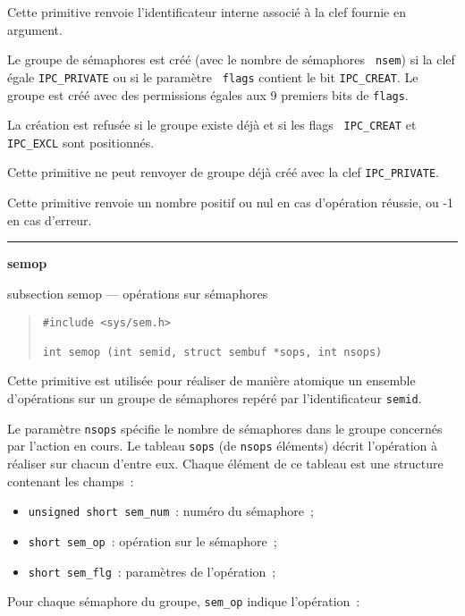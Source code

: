 \documentclass [twoside] {report}
\newcommand {\primitive} [1]
    {
	\phantomsection
	{\large \bf #1}
	\addcontentsline {toc} {subsection} {#1}
    }
\newcommand {\separation}
    {
	\vspace {5mm}
	\nopagebreak
	\hrule
    }
\begin{document}
Cette primitive renvoie l'identificateur interne associé à la clef
fournie en argument.

Le groupe de sémaphores est créé (avec le nombre de sémaphores {\tt
nsem}) si la clef égale {\tt IPC\_PRIVATE} ou si le paramètre {\tt
flags} contient le bit {\tt IPC\_CREAT}.  Le groupe est créé avec des
permissions égales aux 9 premiers bits de {\tt flags}.

La création est refusée si le groupe existe déjà et si les flags {\tt
IPC\_CREAT} et {\tt IPC\_EXCL} sont positionnés.

Cette primitive ne peut renvoyer de groupe déjà créé avec la clef
{\tt IPC\_PRIVATE}.

Cette primitive renvoie un nombre positif ou nul en cas d'opération
réussie, ou -1 en cas d'erreur.


\separation
\primitive {semop} --- opérations sur sémaphores

\begin {quote}
\begin {verbatim}
#include <sys/sem.h>

int semop (int semid, struct sembuf *sops, int nsops)
\end{verbatim}
\end {quote}

Cette primitive est utilisée pour réaliser de manière atomique un
ensemble d'opérations sur un groupe de sémaphores repéré par
l'identificateur {\tt semid}.

Le paramètre {\tt nsops} spécifie le nombre de sémaphores dans le groupe
concernés par l'action en cours.  Le tableau {\tt sops} (de {\tt nsops}
éléments) décrit l'opération à réaliser sur chacun d'entre eux.  Chaque
élément de ce tableau est une structure contenant les champs~:

\begin {itemize}
    \item {\tt unsigned short sem\_num}~: numéro du sémaphore~;
    \item {\tt short sem\_op}~: opération sur le sémaphore~;
    \item {\tt short sem\_flg}~: paramètres de l'opération~;
\end {itemize}

Pour chaque sémaphore du groupe, {\tt sem\_op} indique l'opération~:
\end{document}
